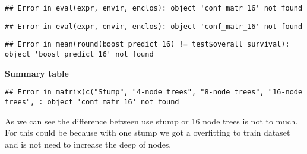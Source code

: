 \documentclass[
]{article}
\newenvironment{Shaded}{\begin{snugshade}}{\end{snugshade}}
\newcommand{\DataTypeTok}[1]{\textcolor[rgb]{0.13,0.29,0.53}{#1}}
\newcommand{\DecValTok}[1]{\textcolor[rgb]{0.00,0.00,0.81}{#1}}
\newcommand{\KeywordTok}[1]{\textcolor[rgb]{0.13,0.29,0.53}{\textbf{#1}}}
\newcommand{\NormalTok}[1]{#1}
\newcommand{\OperatorTok}[1]{\textcolor[rgb]{0.81,0.36,0.00}{\textbf{#1}}}
\newcommand{\StringTok}[1]{\textcolor[rgb]{0.31,0.60,0.02}{#1}}
\begin{document}
\begin{Shaded}
\end{Shaded}

\begin{verbatim}
## Error in eval(expr, envir, enclos): object 'conf_matr_16' not found
\end{verbatim}

\begin{verbatim}
## Error in eval(expr, envir, enclos): object 'conf_matr_16' not found
\end{verbatim}

\begin{Shaded}
\end{Shaded}

\begin{verbatim}
## Error in mean(round(boost_predict_16) != test$overall_survival): object 'boost_predict_16' not found
\end{verbatim}

\textbf{Summary table}

\begin{Shaded}
\end{Shaded}

\begin{verbatim}
## Error in matrix(c("Stump", "4-node trees", "8-node trees", "16-node trees", : object 'conf_matr_16' not found
\end{verbatim}

As we can see the difference between use stump or 16 node trees is not
to much. For this could be because with one stump we got a overfitting
to train dataset and is not need to increase the deep of nodes.
\end{document}

